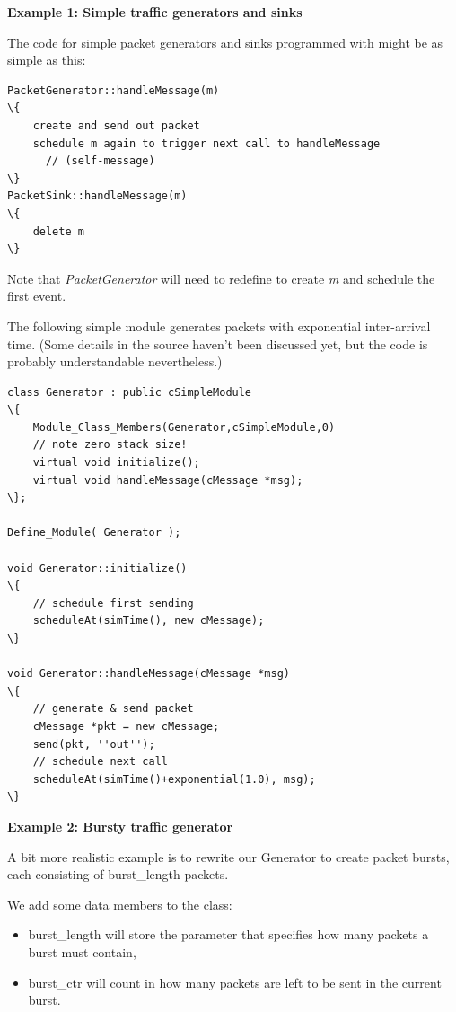 \textbf{Example 1: Simple traffic generators and sinks}


The code for simple packet generators and sinks programmed with  might
be as simple as this:

\begin{Verbatim}[commandchars=\\\{\}]
PacketGenerator::handleMessage(m)
\{
    create and send out packet
    schedule m again to trigger next call to handleMessage
      // (self-message)
\}
PacketSink::handleMessage(m)
\{
    delete m
\}
\end{Verbatim}



Note that \textit{PacketGenerator} will need to redefine 
to create \textit{m} and schedule the first event.

The following simple module generates packets with exponential
inter-arrival time. (Some details in the source haven't been
discussed yet, but the code is probably understandable nevertheless.)


\begin{Verbatim}[commandchars=\\\{\}]
class Generator : public cSimpleModule
\{
    Module_Class_Members(Generator,cSimpleModule,0)
    // note zero stack size!
    virtual void initialize();
    virtual void handleMessage(cMessage *msg);
\};

Define_Module( Generator );

void Generator::initialize()
\{
    // schedule first sending
    scheduleAt(simTime(), new cMessage);
\}

void Generator::handleMessage(cMessage *msg)
\{
    // generate & send packet
    cMessage *pkt = new cMessage;
    send(pkt, ''out'');
    // schedule next call
    scheduleAt(simTime()+exponential(1.0), msg);
\}
\end{Verbatim}



\textbf{Example 2: Bursty traffic generator}


A bit more realistic example is to rewrite our Generator to create
packet bursts, each consisting of burst\_length packets.


We add some data members to the class:
\begin{itemize}
\item{burst\_length will store the parameter that specifies how many
    packets a burst must contain,}
\item{burst\_ctr will count in how many packets are left to be sent
    in the current burst.}
\end{itemize}

